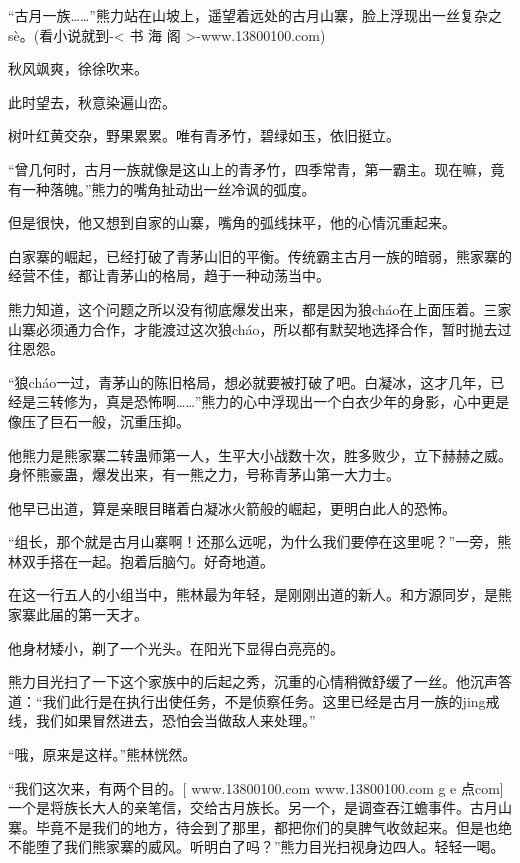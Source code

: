 
\begin{this_body}

“古月一族……”熊力站在山坡上，遥望着远处的古月山寨，脸上浮现出一丝复杂之sè。(看小说就到-< 书 海 阁 >-www.13800100.com)

秋风飒爽，徐徐吹来。

此时望去，秋意染遍山峦。

树叶红黄交杂，野果累累。唯有青矛竹，碧绿如玉，依旧挺立。

“曾几何时，古月一族就像是这山上的青矛竹，四季常青，第一霸主。现在嘛，竟有一种落魄。”熊力的嘴角扯动出一丝冷讽的弧度。

但是很快，他又想到自家的山寨，嘴角的弧线抹平，他的心情沉重起来。

白家寨的崛起，已经打破了青茅山旧的平衡。传统霸主古月一族的暗弱，熊家寨的经营不佳，都让青茅山的格局，趋于一种动荡当中。

熊力知道，这个问题之所以没有彻底爆发出来，都是因为狼cháo在上面压着。三家山寨必须通力合作，才能渡过这次狼cháo，所以都有默契地选择合作，暂时抛去过往恩怨。

“狼cháo一过，青茅山的陈旧格局，想必就要被打破了吧。白凝冰，这才几年，已经是三转修为，真是恐怖啊……”熊力的心中浮现出一个白衣少年的身影，心中更是像压了巨石一般，沉重压抑。

他熊力是熊家寨二转蛊师第一人，生平大小战数十次，胜多败少，立下赫赫之威。身怀熊豪蛊，爆发出来，有一熊之力，号称青茅山第一大力士。

他早已出道，算是亲眼目睹着白凝冰火箭般的崛起，更明白此人的恐怖。

“组长，那个就是古月山寨啊！还那么远呢，为什么我们要停在这里呢？”一旁，熊林双手搭在一起。抱着后脑勺。好奇地道。

在这一行五人的小组当中，熊林最为年轻，是刚刚出道的新人。和方源同岁，是熊家寨此届的第一天才。

他身材矮小，剃了一个光头。在阳光下显得白亮亮的。

熊力目光扫了一下这个家族中的后起之秀，沉重的心情稍微舒缓了一丝。他沉声答道：“我们此行是在执行出使任务，不是侦察任务。这里已经是古月一族的jing戒线，我们如果冒然进去，恐怕会当做敌人来处理。”

“哦，原来是这样。”熊林恍然。

“我们这次来，有两个目的。[ www.13800100.com www.13800100.com g e 点com]一个是将族长大人的亲笔信，交给古月族长。另一个，是调查吞江蟾事件。古月山寨。毕竟不是我们的地方，待会到了那里，都把你们的臭脾气收敛起来。但是也绝不能堕了我们熊家寨的威风。听明白了吗？”熊力目光扫视身边四人。轻轻一喝。


\end{this_body}
